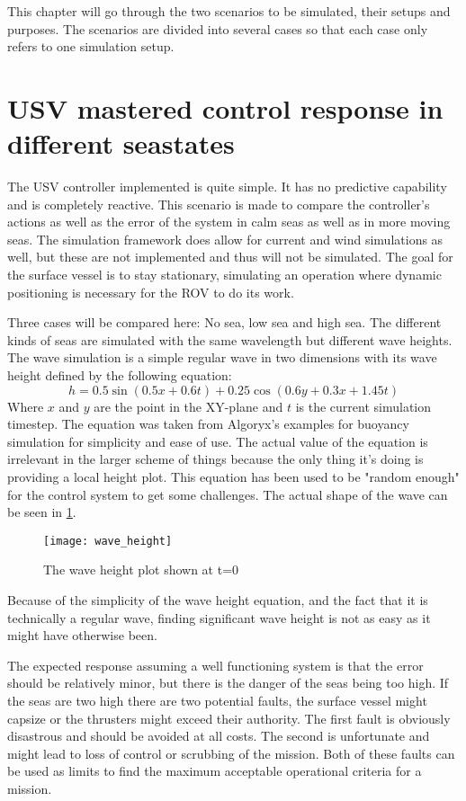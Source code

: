 \documentclass[class=article, crop=false, draft=true]{standalone}
\begin{document}
This chapter will go through the two scenarios to be simulated, their setups and purposes. The scenarios are divided into several cases so that each case only refers to one simulation setup.

\section{USV mastered control response in different seastates}
The USV controller implemented is quite simple. It has no predictive capability and is completely reactive. This scenario is made to compare the controller's actions as well as the error of the system in calm seas as well as in more moving seas. The simulation framework does allow for current and wind simulations as well, but these are not implemented and thus will not be simulated. The goal for the surface vessel is to stay stationary, simulating an operation where dynamic positioning is necessary for the ROV to do its work.

Three cases will be compared here: No sea, low sea and high sea. The different kinds of seas are simulated with the same wavelength but different wave heights. The wave simulation is a simple regular wave in two dimensions with its wave height defined by the following equation:
\[h = 0.5\sin(0.5 x +0.6t) + 0.25\cos(0.6y + 0.3x + 1.45t)\]
Where \(x\) and \(y\) are the point in the XY-plane and \(t\) is the current simulation timestep. The equation was taken from Algoryx's examples for buoyancy simulation for simplicity and ease of use. The actual value of the equation is irrelevant in the larger scheme of things because the only thing it's doing is providing a local height plot. This equation has been used to be "random enough" for the control system to get some challenges. The actual shape of the wave can be seen in \cref{fig:waves}.

\begin{figure}
    \centering
    \texttt{[image: wave\_height]}
    \caption{The wave height plot shown at t=0}
    \label{fig:waves}
\end{figure}

Because of the simplicity of the wave height equation, and the fact that it is technically a regular wave, finding significant wave height is not as easy as it might have otherwise been.

The expected response assuming a well functioning system is that the error should be relatively minor, but there is the danger of the seas being too high. If the seas are two high there are two potential faults, the surface vessel might capsize or the thrusters might exceed their authority. The first fault is obviously disastrous and should be avoided at all costs. The second is unfortunate and might lead to loss of control or scrubbing of the mission. Both of these faults can be used as limits to find the maximum acceptable operational criteria for a mission.
\end{document}
